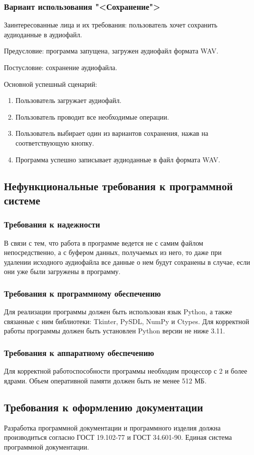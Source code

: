 \subsubsection{Вариант использования "<Сохранение">}

Заинтересованные лица и их требования: пользователь хочет сохранить аудиоданные в аудиофайл.

Предусловие: программа запущена, загружен аудиофайл формата WAV.

Постусловие: сохранение аудиофайла.

Основной успешный сценарий:
\begin{enumerate}
	\item Пользователь загружает аудиофайл.
	\item Пользователь проводит все необходимые операции.
	\item Пользователь выбирает один из вариантов сохранения, нажав на соответствующую кнопку.
	\item Программа успешно записывает аудиоданные в файл формата WAV.
\end{enumerate} 

\subsection{Нефункциональные требования к программной системе}

\subsubsection{Требования к надежности}
В связи с тем, что работа в программе ведется не с самим файлом непосредственно, а с буфером данных, получаемых из него,
то даже при удалении исходного аудиофайла все данные о нем будут сохранены в случае, если они уже были загружены в программу.

\subsubsection{Требования к программному обеспечению}
Для реализации программы должен быть использован язык Python, а также связанные с ним библиотеки: Tkinter, PySDL, NumPy и Ctypes. Для корректной работы программы должен быть установлен Python версии не ниже 3.11.

\subsubsection{Требования к аппаратному обеспечению}
Для корректной работоспособности программы необходим процессор с 2 и более ядрами.
Объем оперативной памяти должен быть не менее 512 МБ.

\subsection{Требования к оформлению документации}

Разработка программной документации и программного изделия должна производиться согласно ГОСТ 19.102-77 и ГОСТ 34.601-90. Единая система программной документации.
